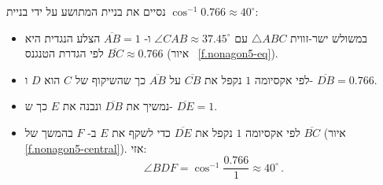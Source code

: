 נסיים את בניית המתושע על ידי בניית
$\cos^{-1} 0.766\approx 40^\circ$:
\begin{itemize}
\item
במשולש ישר-זווית
$\triangle ABC$
עם
$\angle CAB\approx 37.45^\circ$
ו-%
$\overline{AB}=1$
הצלע הנגדית היא
$\overline{BC}\approx 0.766$
לפי הגדרת הטנגנס 
(איור~%
\ref{f.nonagon5-eq}).
\item
לפי אקסיומה 
$1$
נקפל את
$\overline{CB}$
על 
$\overline{AB}$
כך שהשיקוף של
$C$
הוא
$D$
ו-%
$\overline{DB}=0.766$.
\item
נמשיך את
$\overline{DB}$
ונבנה את
$E$
כך ש-%
$\overline{DE}=1$.
\item
לפי אקסיומה 
$1$
נקפל את
$\overline{DE}$
כדי לשקף את
$E$
ב-%
$F$
בהמשך של
$\overline{BC}$
(איור~%
\ref{f.nonagon5-central}).
אזי:
\[
\angle BDF=\cos^{-1} \frac{0.766}{1}\approx 40^\circ\,.
\]
\end{itemize}
